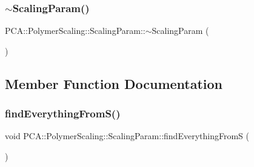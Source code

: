 \hypertarget{class_p_c_a_1_1_polymer_scaling_1_1_scaling_param_a4e1f7212533f55877bb1edb12655e4b1}{}\label{class_p_c_a_1_1_polymer_scaling_1_1_scaling_param_a4e1f7212533f55877bb1edb12655e4b1} 
\subsubsection{\texorpdfstring{$\sim$\+Scaling\+Param()}{~ScalingParam()}}
{\footnotesize\ttfamily P\+C\+A\+::\+Polymer\+Scaling\+::\+Scaling\+Param\+::$\sim$\+Scaling\+Param (\begin{DoxyParamCaption}{ }\end{DoxyParamCaption})}



\subsection{Member Function Documentation}
\hypertarget{class_p_c_a_1_1_polymer_scaling_1_1_scaling_param_a06540f05eef5e1dd4abbb17ff5b3ee9c}{}\label{class_p_c_a_1_1_polymer_scaling_1_1_scaling_param_a06540f05eef5e1dd4abbb17ff5b3ee9c} 
\subsubsection{\texorpdfstring{find\+Everything\+From\+S()}{findEverythingFromS()}}
{\footnotesize\ttfamily void P\+C\+A\+::\+Polymer\+Scaling\+::\+Scaling\+Param\+::find\+Everything\+FromS (\begin{DoxyParamCaption}{ }\end{DoxyParamCaption})\hspace{0.3cm}{\ttfamily [private]}}

\hypertarget{class_p_c_a_1_1_polymer_scaling_1_1_scaling_param_a981e9bd9307e657fe02832ea5c4154fa}{}\label{class_p_c_a_1_1_polymer_scaling_1_1_scaling_param_a981e9bd9307e657fe02832ea5c4154fa} 
